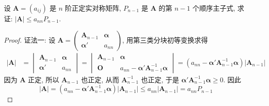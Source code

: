 \documentclass[../../main.tex]{subfiles}
\begin{document}
\begin{proposition}\label{proposition:关于正定阵的行列式的不等式}
设 \(\boldsymbol{A}=(a_{ij})\) 是 \(n\) 阶正定实对称矩阵, \(P_{n - 1}\) 是 \(\boldsymbol{A}\) 的第 \(n - 1\) 个顺序主子式, 求证: \(|\boldsymbol{A}|\leq a_{nn}P_{n - 1}\).
\end{proposition}
\begin{proof}
{\color{blue}证法一:}
设 \(\boldsymbol{A}=\begin{pmatrix}\boldsymbol{A}_{n - 1}&\boldsymbol{\alpha}\\\boldsymbol{\alpha}'&a_{nn}\end{pmatrix}\), 用第三类分块初等变换求得
\begin{align*}
|\boldsymbol{A}|&=\begin{vmatrix}\boldsymbol{A}_{n - 1}&\boldsymbol{\alpha}\\\boldsymbol{\alpha}'&a_{nn}\end{vmatrix}=\begin{vmatrix}\boldsymbol{A}_{n - 1}&\boldsymbol{\alpha}\\\boldsymbol{O}&a_{nn}-\boldsymbol{\alpha}'\boldsymbol{A}_{n - 1}^{-1}\boldsymbol{\alpha}\end{vmatrix}=(a_{nn}-\boldsymbol{\alpha}'\boldsymbol{A}_{n - 1}^{-1}\boldsymbol{\alpha})|\boldsymbol{A}_{n - 1}|
\end{align*}
因为 \(\boldsymbol{A}\) 正定, 所以 \(\boldsymbol{A}_{n - 1}\) 也正定, 从而 \(\boldsymbol{A}_{n - 1}^{-1}\) 也正定, 于是 \(\boldsymbol{\alpha}'\boldsymbol{A}_{n - 1}^{-1}\boldsymbol{\alpha}\geq0\). 因此
\[|\boldsymbol{A}|=(a_{nn}-\boldsymbol{\alpha}'\boldsymbol{A}_{n - 1}^{-1}\boldsymbol{\alpha})|\boldsymbol{A}_{n - 1}|\leq a_{nn}|\boldsymbol{A}_{n - 1}|=a_{nn}P_{n - 1}\]


\end{proof}
\end{document}
